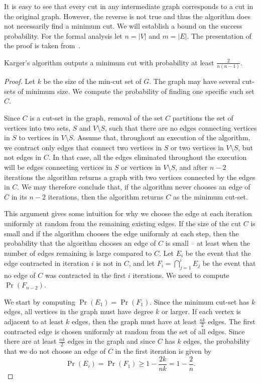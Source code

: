It is easy to see that every cut in any intermediate graph corresponds to a cut
in the original graph.
However, the reverse is not true and thus the algorithm does not necessarily
find a minimum cut.
We will establish a bound on the success probability.
For the formal analysis let $n=|V|$ and $m=|E|$.
The presentation of the proof is taken from~\cite{MitzenmacherUpfal2005}.

\begin{theorem}
  Karger's algorithm outputs a minimum cut with probability at least $\frac{2}{n(n-1)}$.
\end{theorem}
\begin{proof}
  Let $k$ be the size of the min-cut set of $G$. 
  The graph may have several cut-sets of minimum size. 
  We compute the probability of finding one specific such set $C$.

  Since $C$ is a cut-set in the graph, removal of the set $C$ partitions the set
  of vertices into two sets, $S$ and $V \setminus S$, such that there are no
  edges connecting vertices in $S$ to vertices in $V \setminus S$. 
  Assume that, throughout an execution of the algorithm, we contract only edges
  that connect two vertices in $S$ or two vertices in $V \setminus S$, but not
  edges in $C$.
  In that case, all the edges eliminated throughout the execution will be edges
  connecting vertices in $S$ or vertices in $V \setminus S$, and after $n - 2$
  iterations the algorithm returns a graph with two vertices connected by the
  edges in $C$. 
  We may therefore conclude that, if the algorithm never chooses an edge of $C$
  in its $n - 2$ iterations, then the algorithm returns $C$ as the minimum
  cut-set.
  
  This argument gives some intuition for why we choose the edge at each
  iteration uniformly at random from the remaining existing edges. 
  If the size of the cut $C$ is small and if the algorithm chooses the edge
  uniformly at each step, then the probability that the algorithm chooses an
  edge of $C$ is small -- at least when the number of edges remaining is large
  compared to $C$.
  Let $E_i$ be the event that the edge contracted in iteration $i$ is not in
  $C$, and let $F_i = \bigcap_{j=1}^i E_j$ be the event that no edge of $C$ was
  contracted in the first $i$ iterations. 
  We need to compute $\Pr(F_{n-2})$.

  We start by computing $\Pr(E_1) = \Pr(F_1)$. 
  Since the minimum cut-set has $k$ edges, all vertices in the graph must have
  degree $k$ or larger. 
  If each vertex is adjacent to at least $k$ edges, then the graph must have at
  least $\frac{nk}{2}$ edges. 
  The first contracted edge is chosen uniformly at random from the set of all
  edges. 
  Since there are at least $\frac{nk}{2}$ edges in the graph and since $C$ has $k$ edges, the
  probability that we do not choose an edge of $C$ in the first iteration is given
  by
  \[\Pr(E_i) = \Pr(F_1) \geq 1 - \frac{2k}{nk} = 1 - \frac{2}{n}.\]


\end{proof}
